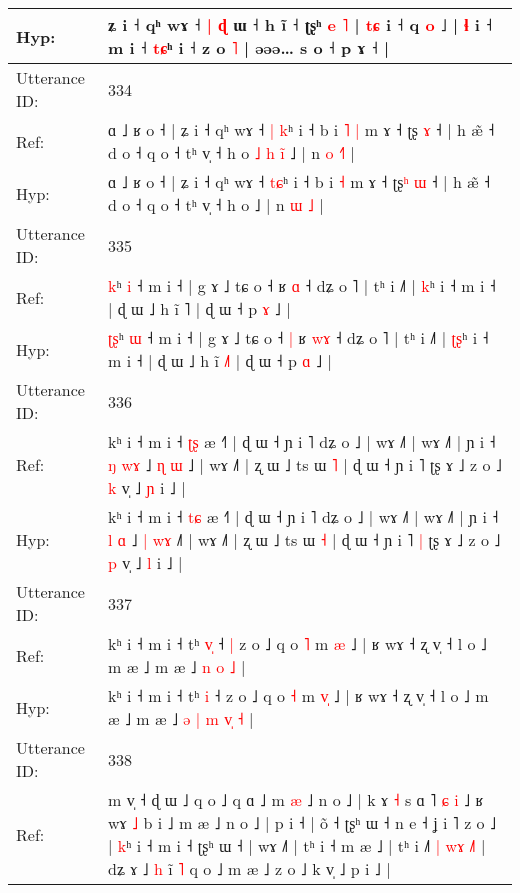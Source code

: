 \documentclass[10pt]{article}
\DeclareRobustCommand{\hl}[1]{{\textcolor{red}{#1}}}
\begin{document}
\begin{longtable}{ll}
 \\
Hyp: & ʑ i ˧ qʰ wɤ ˧\hl{}\hl{}\hl{}\hl{} \hl{|} \hl{ɖ} ɯ ˧ h ĩ ˧ ʈʂʰ \hl{e} \hl{˥} | \hl{t}\hl{ɕ} i ˧ q \hl{o} ˩ | \hl{}\hl{ɬ} i ˧ m i ˧ \hl{}\hl{t}\hl{ɕ}ʰ i ˧ z o \hl{˥} | əəə… s o ˧ p ɤ ˧ |
 \\
\midrule
Utterance ID: & 334 \\
Ref: & ɑ ˩ ʁ o ˧ | ʑ i ˧ qʰ wɤ ˧ \hl{|}\hl{ }\hl{k}ʰ i ˧ b i\hl{ }\hl{˥} \hl{|} m ɤ ˧ ʈʂ\hl{} \hl{ɤ} ˧ | h æ̃ ˧ d o ˧ q o ˧ tʰ v̩ ˧ h o\hl{ }\hl{˩}\hl{ }\hl{h}\hl{ }\hl{i}\hl{̃} ˩ | n \hl{o} \hl{˧}\hl{˥} |
 \\
Hyp: & ɑ ˩ ʁ o ˧ | ʑ i ˧ qʰ wɤ ˧ \hl{}\hl{t}\hl{ɕ}ʰ i ˧ b i\hl{}\hl{} \hl{˧} m ɤ ˧ ʈʂ\hl{ʰ} \hl{ɯ} ˧ | h æ̃ ˧ d o ˧ q o ˧ tʰ v̩ ˧ h o\hl{}\hl{}\hl{}\hl{}\hl{}\hl{}\hl{} ˩ | n \hl{ɯ} \hl{}\hl{˩} |
 \\
\midrule
Utterance ID: & 335 \\
Ref: & \hl{}\hl{k}ʰ \hl{i} ˧ m i ˧ | g ɤ ˩ tɕ o ˧\hl{}\hl{} ʁ \hl{}\hl{ɑ} ˧ dʑ o ˥ | tʰ i ˩˥ | \hl{}\hl{k}ʰ i ˧ m i ˧ | ɖ ɯ ˩ h ĩ \hl{}˥ | ɖ ɯ ˧ p \hl{ɤ} ˩ |
 \\
Hyp: & \hl{ʈ}\hl{ʂ}ʰ \hl{ɯ} ˧ m i ˧ | g ɤ ˩ tɕ o ˧\hl{ }\hl{|} ʁ \hl{w}\hl{ɤ} ˧ dʑ o ˥ | tʰ i ˩˥ | \hl{ʈ}\hl{ʂ}ʰ i ˧ m i ˧ | ɖ ɯ ˩ h ĩ \hl{˩}˥ | ɖ ɯ ˧ p \hl{ɑ} ˩ |
 \\
\midrule
Utterance ID: & 336 \\
Ref: & kʰ i ˧ m i ˧ \hl{ʈ}\hl{ʂ} æ ˧˥ | ɖ ɯ ˧ ɲ i ˥ dʑ o ˩ | wɤ ˩˥ | wɤ ˩˥ | ɲ i ˧ \hl{ŋ} \hl{w}\hl{ɤ} ˩ \hl{ɳ} \hl{}\hl{ɯ} ˩\hl{} | wɤ ˩˥ | ʐ ɯ ˩ ts ɯ \hl{˥} | ɖ ɯ ˧ ɲ i ˥\hl{}\hl{} ʈʂ ɤ ˩ z o ˩ \hl{k} v̩ ˩ \hl{ɲ} i ˩ |
 \\
Hyp: & kʰ i ˧ m i ˧ \hl{t}\hl{ɕ} æ ˧˥ | ɖ ɯ ˧ ɲ i ˥ dʑ o ˩ | wɤ ˩˥ | wɤ ˩˥ | ɲ i ˧ \hl{l} \hl{}\hl{ɑ} ˩ \hl{|} \hl{w}\hl{ɤ} ˩\hl{˥} | wɤ ˩˥ | ʐ ɯ ˩ ts ɯ \hl{˧} | ɖ ɯ ˧ ɲ i ˥\hl{ }\hl{|} ʈʂ ɤ ˩ z o ˩ \hl{p} v̩ ˩ \hl{l} i ˩ |
 \\
\midrule
Utterance ID: & 337 \\
Ref: & kʰ i ˧ m i ˧ tʰ \hl{v}\hl{̩} ˧\hl{ }\hl{|} z o ˩ q o \hl{˥} m \hl{}\hl{æ} ˩ | ʁ wɤ ˧ ʐ v̩ ˧ l o ˩ m æ ˩ m æ ˩\hl{}\hl{}\hl{}\hl{} \hl{n} \hl{}\hl{o} \hl{˩} |
 \\
Hyp: & kʰ i ˧ m i ˧ tʰ \hl{}\hl{i} ˧\hl{}\hl{} z o ˩ q o \hl{˧} m \hl{v}\hl{̩} ˩ | ʁ wɤ ˧ ʐ v̩ ˧ l o ˩ m æ ˩ m æ ˩\hl{ }\hl{ə}\hl{ }\hl{|} \hl{m} \hl{v}\hl{̩} \hl{˧} |
 \\
\midrule
Utterance ID: & 338 \\
Ref: & m v̩ ˧ ɖ ɯ ˩ q o ˩ q ɑ ˩ m \hl{}\hl{æ} ˩ n o ˩ | k ɤ \hl{˧} s ɑ ˥\hl{}\hl{} \hl{ɕ} \hl{i} ˩ ʁ wɤ \hl{˩} b i ˩ m æ ˩ n o ˩ | p i ˧ | õ ˧ ʈʂʰ ɯ ˧ n e ˧ ʝ i ˥\hl{}\hl{} z o ˩ | \hl{}\hl{k}ʰ i ˧ m i ˧ ʈʂʰ ɯ ˧ | wɤ ˩˥ | tʰ i ˧ m æ ˩ | tʰ i ˩\hl{˥}\hl{ }\hl{|} \hl{}\hl{w}\hl{ɤ} \hl{˩}\hl{˥} | dʑ ɤ ˩\hl{ }\hl{h} ĩ\hl{ }\hl{˥} q o ˩ m æ ˩ z o ˩ k v̩ ˩ p i ˩ |

\end{longtable}
\end{document}

